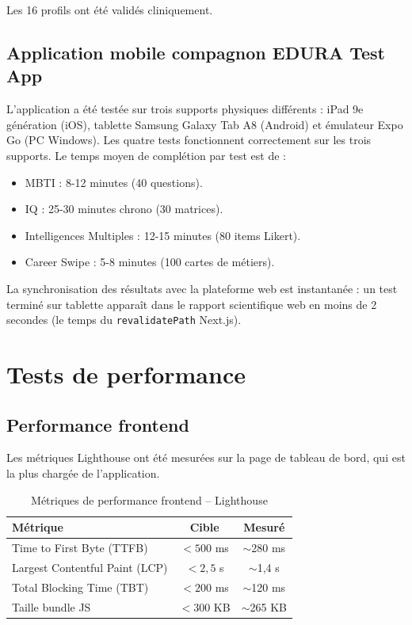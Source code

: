\documentclass[12pt,a4paper,oneside]{report}
\begin{document}
Les 16 profils ont été validés cliniquement.

\subsection{Application mobile compagnon EDURA Test App}

L'application a été testée sur trois supports physiques différents : iPad 9e génération (iOS), tablette Samsung Galaxy Tab A8 (Android) et émulateur Expo Go (PC Windows). Les quatre tests fonctionnent correctement sur les trois supports. Le temps moyen de complétion par test est de :
\begin{itemize}
  \item MBTI : 8-12 minutes (40 questions).
  \item IQ : 25-30 minutes chrono (30 matrices).
  \item Intelligences Multiples : 12-15 minutes (80 items Likert).
  \item Career Swipe : 5-8 minutes (100 cartes de métiers).
\end{itemize}

La synchronisation des résultats avec la plateforme web est instantanée : un test terminé sur tablette apparaît dans le rapport scientifique web en moins de 2 secondes (le temps du \texttt{revalidatePath} Next.js).

\section{Tests de performance}

\subsection{Performance frontend}

Les métriques Lighthouse ont été mesurées sur la page de tableau de bord, qui est la plus chargée de l'application.

\begin{table}[H]
\centering
\caption{Métriques de performance frontend -- Lighthouse}
\label{tab:perf}
\begin{tabular}{lcc}
\toprule
\textbf{Métrique} & \textbf{Cible} & \textbf{Mesuré} \\
\midrule
Time to First Byte (TTFB) & $< 500$ ms & $\sim$280 ms \\
Largest Contentful Paint (LCP) & $< 2{,}5$ s & $\sim$1,4 s \\
Total Blocking Time (TBT) & $< 200$ ms & $\sim$120 ms \\
Taille bundle JS & $< 300$ KB & $\sim$265 KB \\
\bottomrule
\end{tabular}
\end{table}
\end{document}
